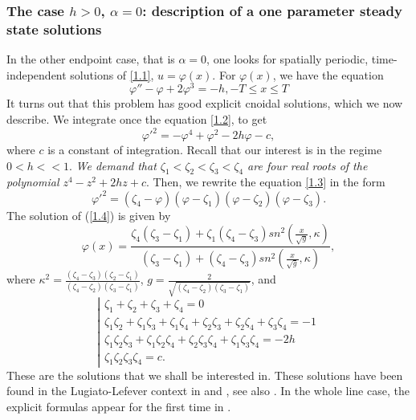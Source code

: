 \documentclass[12pt]{amsart}
\theoremstyle{definition}
\theoremstyle{remark}
\numberwithin{equation}{section}
\renewcommand{\(}{\left(}
\renewcommand{\)}{\right)}
\renewcommand{\[}{\left[}
\renewcommand{\]}{\right]}
\newcommand{\al}{\alpha}
\newcommand{\vp}{\varphi}
\begin{document}
\subsubsection{The case $h>0$, $\al=0$: description of a one parameter steady state  solutions}
In the other endpoint case, that is $\al=0$, one looks for spatially periodic, time-independent  solutions of \eqref{1.1}, $u=\vp(x)$. For  $\varphi (x)$, we have the equation
\begin{equation}\label{1.2}
  \varphi''-\varphi+2\varphi^3=-h, -T\leq x\leq T
\end{equation}
It turns out that this problem has good explicit cnoidal solutions, which we now describe.
 We integrate  once the equation \eqref{1.2}, to  get
 \begin{equation}\label{1.3}
 \varphi'^2=-\varphi^4+\varphi^2-2h\varphi-c,
 \end{equation}
 where $c$ is a constant of integration. Recall that our interest is in the regime $0<h<<1$.
 {\it We demand that  $\zeta_1<\zeta_2<\zeta_3<\zeta_4$ are four real roots of the polynomial $z^4-z^2+2hz+c$}. Then, we  rewrite the equation \eqref{1.3} in the form
 \begin{equation}\label{1.4}
 \varphi'^2=(\zeta_4-\varphi )(\varphi-\zeta_1)(\varphi-\zeta_2)(\varphi-\zeta_3).
 \end{equation}
 The solution of   (\ref{1.4}) is given by
 \begin{equation}\label{1.5}
 \varphi(x)=\frac{\zeta_4(\zeta_3-\zeta_1)+\zeta_1(\zeta_4-\zeta_3)sn^2(\frac{x}{\sqrt{g}}, \kappa)}{(\zeta_3-\zeta_1)+(\zeta_4-\zeta_3)sn^2(\frac{x}{\sqrt{g}}, \kappa)},
 \end{equation}
where $\kappa^2=\frac{(\zeta_4-\zeta_3)(\zeta_2-\zeta_1)}{(\zeta_4-\zeta_2)(\zeta_3-\zeta_1)}$, $g=\frac{2}{\sqrt{(\zeta_4-\zeta_2)(\zeta_3-\zeta_1)}}$, and
\begin{equation}\label{1.6}
\left| \begin{array}{ll}
\zeta_1+\zeta_2+\zeta_3+\zeta_4=0\\
\zeta_1\zeta_2+\zeta_1\zeta_3+\zeta_1\zeta_4+\zeta_2\zeta_3+\zeta_2\zeta_4+\zeta_3\zeta_4=-1\\
\zeta_1\zeta_2\zeta_3+\zeta_1\zeta_2\zeta_4+\zeta_2\zeta_3\zeta_4+
\zeta_1\zeta_3\zeta_4=-2h\\
\zeta_1\zeta_2\zeta_3\zeta_4=c.
\end{array} \right.
\end{equation}
  These are   the solutions that we shall be interested in. These solutions have been found  in the Lugiato-Lefever context in \cite{BS} and \cite{Matsko}, see also \cite{Mat1}. In the whole line case, the explicit formulas appear for the first time in \cite{BS}.
\end{document}
